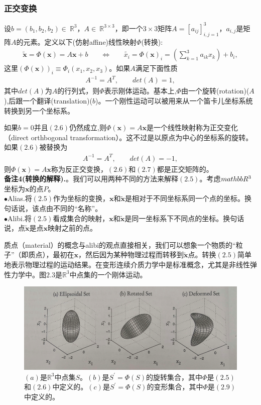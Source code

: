 \documentclass[12pt,a4paper]{article}
\numberwithin{equation}{section}
\begin{document}
\subsubsection{正交变换}
设$b = (b_1, b_2, b_2)\in~\mathbb{R}^3$，$A\in~\mathbb{R}^{3\times 3}$，即一个$3\times 3$矩阵$A=[a_{ij}]_{i,j=1}^3$，$a_{i,j}$是矩阵$A$的元素。定义以下(仿射affine)线性映射$\Phi$(转换):
\begin{gather}
\tilde{\mathbf{x}}=\Phi (\mathbf{x})=A\mathbf{x}+b~~~~~~~~\Leftrightarrow~~~~~~~~\tilde{x_i}=\Phi (\mathbf{x})_i=\left( \sum _{k=1}^{3}a_{ik}x_{k} \right)+b_i,
\end{gather}
这里$(\Phi(\mathbf{x}))_i\equiv \Phi _i(x_1,x_2,x_3)$。如果$A$满足下面性质
\begin{gather}
A^{-1}=A^{T},~~~~~~~~~det(A)=1,
\end{gather}
其中$det(A)$为$A$的行列式，则$\Phi$表示刚体运动。基本上,$\Phi$由一个旋转(rotation)($A$),后跟一个翻译(translation)($b$)。一个刚性运动可以被用来从一个笛卡儿坐标系统转换到另一个坐标系。

如果$b=0$并且$(2.6)$仍然成立,则$\Phi(\mathbf{x})=A\mathbf{x}$是一个线性映射称为正交变化（direct orthbogonal transformation）。这不过是以原点为中心的坐标系的旋转。如果$(2.6)$被替换为
\begin{gather}
A^{-1}=A^{T},~~~~~~~~~det(A)=-1,
\end{gather}
则$\Phi(\mathbf{x})=A\mathbf{x}$称为反正交变换，$(2.6)$和$(2.7)$都是正交矩阵的。\\

\textbf{备注4(转换的解释).}。我们可以用两种不同的方法来解释$(2.5)$。考虑$\\mathbb{R}^3$坐标为$\mathbf{x}$的点$P$。\\

$\bullet$Alias.将$(2.5)$作为坐标的变换，$\mathbf{x}$和$\tilde{\mathbf{x}}$是相对于不同坐标系同一个点的坐标。换句话说，该点由不同的“名称”。\\

$\bullet$Alibi.将$(2.5)$看成集合的映射，$\mathbf{x}$和$\tilde{\mathbf{x}}$是同一坐标系下不同点的坐标。换句话说，点$\tilde{\mathbf{x}}$是点$\mathbf{x}$映射之前的点。

质点（material）的概念与alibi的观点直接相关，我们可以想象一个物质的“粒子”（即质点），最初在$\mathbf{x}$，然后因为某种物理过程而转移到$\tilde{\mathbf{x}}$点。转换$(2.5)$简单地表示物理过程的运动结果。在变形连续介质力学中是标准概念，尤其是非线性弹性力学中。图$2.3$是$\mathbb{R}^3$中点集的一个刚体运动。

\begin{figure}[H]
\centering
\includegraphics[scale=0.5]{./figures/23.png}
\caption{$(a)$是$\mathbb{R}^3$中点集$S$。$(b)$是$S^{'}=\Phi (S)$的旋转集合，其中$\Phi$是$(2.5)$和$(2.6)$中定义的。$(c)$是$S^{'}=\Phi (S)$的变形集合，其中$\Phi$是$(2.9)$中定义的。}
\end{figure}





\cite{tam19912d}
%
\end{document}
